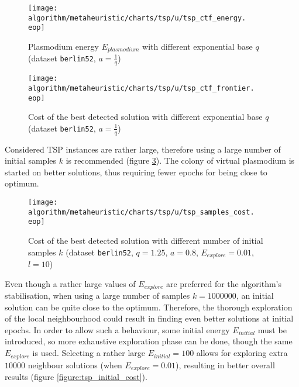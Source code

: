 \begin{figure}
  \centering

  \texttt{[image: algorithm/metaheuristic/charts/tsp/u/tsp\_ctf\_energy.\\eop]}

  \caption{Plasmodium energy $E_{plasmodium}$ with different exponential base $q$ (dataset \texttt{berlin52}, $a=\frac{1}{q}$)}
  \label{figure:tsp_ctf_energy}
\end{figure}

\begin{figure}
  \centering

  \texttt{[image: algorithm/metaheuristic/charts/tsp/u/tsp\_ctf\_frontier.\\eop]}

  \caption{Cost of the best detected solution with different exponential base $q$ (dataset \texttt{berlin52}, $a=\frac{1}{q}$)}
  \label{figure:tsp_ctf_frontier}
\end{figure}

Considered TSP instances are rather large, therefore using a large number of initial samples $k$ is recommended (figure \ref{figure:tsp_samples_cost}). The colony of virtual plasmodium is started on better solutions, thus requiring fewer epochs for being close to optimum.

\begin{figure}
  \centering

  \texttt{[image: algorithm/metaheuristic/charts/tsp/u/tsp\_samples\_cost.\\eop]}

  \caption{Cost of the best detected solution with different number of initial samples $k$ (dataset \texttt{berlin52}, $q=1.25$, $a=0.8$, $E_{explore}=0.01$, $l=10$)}
  \label{figure:tsp_samples_cost}
\end{figure}

Even though a rather large values of $E_{explore}$ are preferred for the algorithm's stabilisation, when using a large number of samples $k=1000000$, an initial solution can be quite close to the optimum. Therefore, the thorough exploration of the local neighbourhood could result in finding even better solutions at initial epochs. In order to allow such a behaviour, some initial energy $E_{initial}$ must be introduced, so more exhaustive exploration phase can be done, though the same $E_{explore}$ is used. Selecting a rather large $E_{initial}=100$ allows for exploring extra $10000$ neighbour solutions (when $E_{explore}=0.01$), resulting in better overall results (figure \ref{figure:tsp_initial_cost}).

